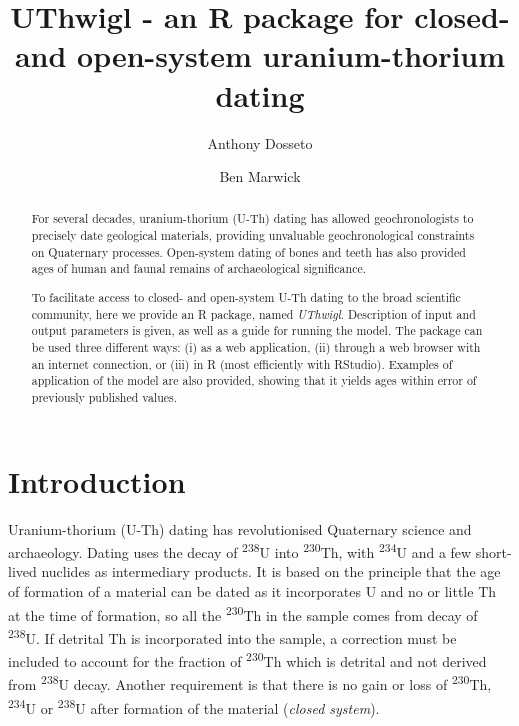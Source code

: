 \documentclass[]{elsarticle} %
\begin{document}
\begin{frontmatter}

  \title{UThwigl - an R package for closed- and open-system uranium-thorium dating}
    \author[University of Wollongong]{Anthony Dosseto}
    \author[University of Washington]{Ben Marwick}
      \address[University of Wollongong]{Wollongong Isotope Geochronology Laboratory, School of Earth, Atmosphere \& Life Sciences, University of Wollongong, Wollongong NSW Australia}
    \address[University of Washington]{Department of Anthropology, University of Washington, Seattle, WA, USA}
    
  \begin{abstract}
  For several decades, uranium-thorium (U-Th) dating has allowed geochronologists to precisely date geological materials, providing unvaluable geochronological constraints on Quaternary processes. Open-system dating of bones and teeth has also provided ages of human and faunal remains of archaeological significance.
  
  To facilitate access to closed- and open-system U-Th dating to the broad scientific community, here we provide an R package, named \emph{UThwigl}. Description of input and output parameters is given, as well as a guide for running the model. The package can be used three different ways: (i) as a web application, (ii) through a web browser with an internet connection, or (iii) in R (most efficiently with RStudio). Examples of application of the model are also provided, showing that it yields ages within error of previously published values.
  \end{abstract}
  
 \end{frontmatter}

\newpage
\linenumbers

\hypertarget{introduction}{%
\section{Introduction}\label{introduction}}

Uranium-thorium (U-Th) dating has revolutionised Quaternary science and archaeology. Dating uses the decay of \textsuperscript{238}U into \textsuperscript{230}Th, with \textsuperscript{234}U and a few short-lived nuclides as intermediary products. It is based on the principle that the age of formation of a material can be dated as it incorporates U and no or little Th at the time of formation, so all the \textsuperscript{230}Th in the sample comes from decay of \textsuperscript{238}U. If detrital Th is incorporated into the sample, a correction must be included to account for the fraction of \textsuperscript{230}Th which is detrital and not derived from \textsuperscript{238}U decay. Another requirement is that there is no gain or loss of \textsuperscript{230}Th, \textsuperscript{234}U or \textsuperscript{238}U after formation of the material (\emph{closed system}).
\end{document}
